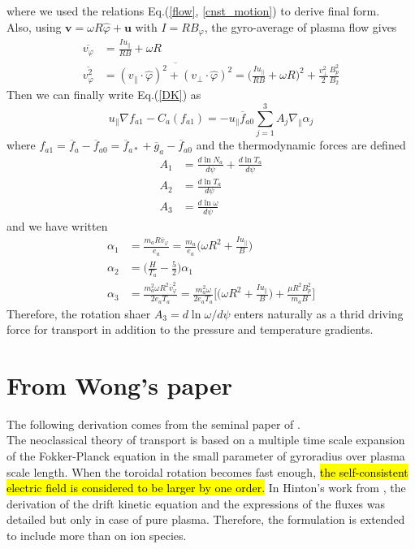 where we used the relations Eq.(\ref{flow}, \ref{cnst_motion}) to derive final form. \\
Also, using $\bm{v}=\omega R \hat{\varphi} + \bm{u}$ with $I=RB_\varphi$, the gyro-average of plasma flow gives 
\begin{align}
    \overbar{v_\varphi} &= \frac{I u_\parallel}{RB} + \omega R \nonumber \\
    \overbar{v_\varphi^2} &= \overbar{(v_\parallel \cdot \hat{\varphi})^2 + (v_\perp \cdot \hat{\varphi})^2} = \Big(\frac{I u_\parallel}{RB}+\omega R \Big)^2 + \frac{v_\perp^2}{2}\frac{B_p^2}{B_2}
\end{align}
Then we can finally write Eq.(\ref{DK}) as 
\begin{equation}
    u_\parallel \nabla f_{a1} - C_a(f_{a1}) = -u_\parallel \overbar{f}_{a0}\sum_{j=1}^3 A_j \nabla_\parallel \alpha_j
\end{equation}
where $f_{a1}=\overbar{f}_a-\overbar{f}_{a0}=\overbar{f}_{a*}+\overbar{g}_a-\overbar{f}_{a0}$ and the thermodynamic forces are defined
\begin{align}
    A_1 &= \frac{d\ln{N_a}}{d\psi} + \frac{d\ln{T_a}}{d\psi} \\
    A_2 &= \frac{d\ln{T_a}}{d\psi} \\
    A_3 &= \frac{d\ln{\omega}}{d\psi}
\end{align}
and we have written
\begin{align}
    \alpha_1 &=\frac{m_a R \overbar{v}_\varphi}{e_a} = \frac{m_a}{e_a}\Big(\omega R^2 + \frac{I u_\parallel}{B}\Big) \\
    \alpha_2 &= \big (\frac{H}{T_a}-\frac{5}{2}\Big)\alpha_1 \\
    \alpha_3 &= \frac{m_a^2 \omega R^2 \overbar{v}_\varphi^2}{2e_aT_a} = \frac{m_a^2 \omega}{2 e_a T_a}\Bigg[\Big(\omega R^2 + \frac{I u_\parallel}{B}\Big) + \frac{\mu R^2 B_p^2}{m_a B}\Bigg]
\end{align}
Therefore, the rotation shaer $A_3=d\ln{\omega}/d\psi$ enters naturally as a thrid driving force for transport in addition to the pressure and temperature gradients.

\section{From Wong's paper}
The following derivation comes from the seminal paper of \citep{Wong87}. \\
The neoclassical theory of transport is based on a multiple time scale expansion of the Fokker-Planck equation in the small parameter of gyroradius over plasma scale length. When the toroidal rotation becomes fast enough, \hl{the self-consistent electric field is considered to be larger by one order.} In Hinton's work from \citep{Hinton85}, the derivation of the drift kinetic equation and the expressions of the fluxes was detailed but only in case of pure plasma. Therefore, the formulation is extended to include more than on ion species.